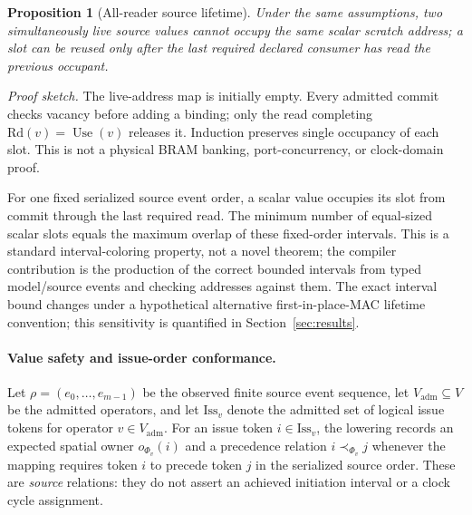 \documentclass{article}
\newtheorem{proposition}{Proposition}
\begin{document}
\begin{proposition}[All-reader source lifetime]
Under the same assumptions, two simultaneously live source values cannot occupy the same scalar scratch address; a slot can be reused only after the last required declared consumer has read the previous occupant.
\end{proposition}
\noindent\emph{Proof sketch.} The live-address map is initially empty. Every admitted commit checks vacancy before adding a binding; only the read completing $\mathrm{Rd}(v)=\operatorname{Use}(v)$ releases it. Induction preserves single occupancy of each slot. This is not a physical BRAM banking, port-concurrency, or clock-domain proof.\par

For one fixed serialized source event order, a scalar value occupies its slot from commit through the last required read. The minimum number of equal-sized scalar slots equals the maximum overlap of these fixed-order intervals. This is a standard interval-coloring property, not a novel theorem; the compiler contribution is the production of the correct bounded intervals from typed model/source events and checking addresses against them. The exact interval bound changes under a hypothetical alternative first-in-place-MAC lifetime convention; this sensitivity is quantified in Section~\ref{sec:results}.

\paragraph{Value safety and issue-order conformance.}
Let $\rho=(e_0,\ldots,e_{m-1})$ be the observed finite source event sequence, let $V_{\mathrm{adm}}\subseteq V$ be the admitted operators, and let $\mathrm{Iss}_v$ denote the admitted set of logical issue tokens for operator $v\in V_{\mathrm{adm}}$. For an issue token $i\in\mathrm{Iss}_v$, the lowering records an expected spatial owner $o_{\Phi_v}(i)$ and a precedence relation $i\prec_{\Phi_v}j$ whenever the mapping requires token $i$ to precede token $j$ in the serialized source order. These are \emph{source} relations: they do not assert an achieved initiation interval or a clock cycle assignment.
\end{document}
